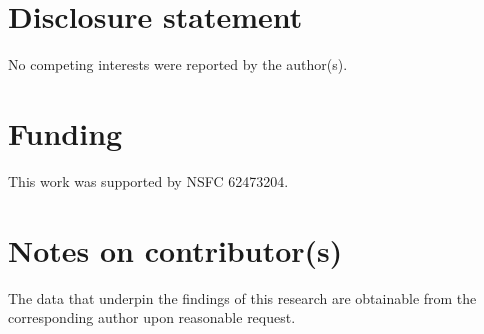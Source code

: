 \documentclass[]{interact}
\theoremstyle{plain}%
\theoremstyle{definition}
\theoremstyle{remark}
\begin{document}
\section*{Disclosure statement}
No competing interests were reported by the author(s).


\section*{Funding}
This work was supported by NSFC 62473204.   


\section*{Notes on contributor(s)}

The data that underpin the findings of this research are obtainable from the corresponding author upon reasonable request.









\end{document}
